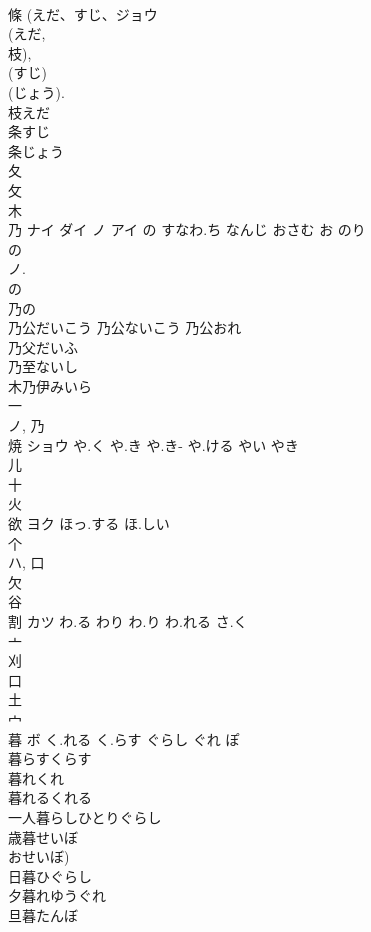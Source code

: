 \documentclass[8pt]{extreport}
\begin{document}
\begin{CJK}{UTF8}{min}
\\	條 (えだ、すじ、ジョウ 
\\	(えだ, 
\\	枝), 
\\	(すじ) 
\\	(じょう). 
\\	枝えだ 
\\	条すじ 
\\	条じょう 
\\	夂 
\\	攵 
\\	木 
\\	乃	ナイ ダイ ノ アイ	の すなわ.ち なんじ おさむ お のり	
\\	の 
\\	ノ. 
\\	の 
\\	乃の 
\\	乃公だいこう 乃公ないこう 乃公おれ 
\\	乃父だいふ 
\\	乃至ないし 
\\	木乃伊みいら 
\\	一 
\\	ノ, 乃 
\\	焼	ショウ	や.く や.き や.き- や.ける やい やき	
\\	儿 
\\	十 
\\	火 
\\	欲	ヨク	ほっ.する ほ.しい	
\\	个 
\\	ハ, 口 
\\	欠 
\\	谷 
\\	割	カツ	わ.る わり わ.り わ.れる さ.く	
\\	亠 
\\	刈 
\\	口 
\\	土 
\\	宀 
\\	暮	ボ	く.れる く.らす ぐらし ぐれ ぽ	
\\	暮らすくらす
\\	暮れくれ
\\	暮れるくれる
\\	一人暮らしひとりぐらし
\\	歳暮せいぼ
\\	おせいぼ)
\\	日暮ひぐらし
\\	夕暮れゆうぐれ
\\	旦暮たんぼ

\end{CJK}
\end{document}
